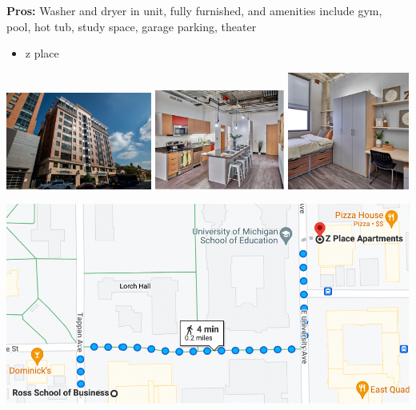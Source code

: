 \documentclass[
]{book}
\providecommand{\tightlist}{%
  \setlength{\itemsep}{0pt}\setlength{\parskip}{0pt}}
\begin{document}
\textbf{Pros:} Washer and dryer in unit, fully furnished, and amenities include gym, pool, hot tub, study space, garage parking, theater

\begin{itemize}
\tightlist
\item
  z place
\end{itemize}

\includegraphics[width=0.36\textwidth,height=\textheight]{zplace_exterior.png}
\includegraphics[width=0.32\textwidth,height=\textheight]{zplace_interior1.png}
\includegraphics[width=0.3\textwidth,height=\textheight]{zplace_interior2.png}

\begin{center}\includegraphics{zplace_map} \end{center}
\end{document}
